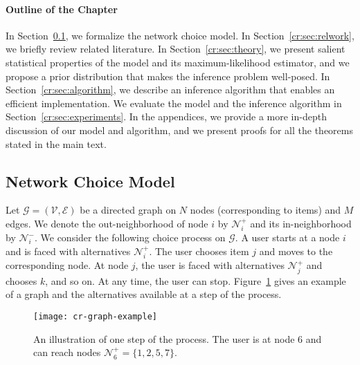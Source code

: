 \paragraph{Outline of the Chapter}
In Section~\ref{cr:sec:model}, we formalize the network choice model.
In Section~\ref{cr:sec:relwork}, we briefly review related literature.
In Section~\ref{cr:sec:theory}, we present salient statistical properties of the model and its maximum-likelihood estimator, and we propose a prior distribution that makes the inference problem well-posed.
In Section~\ref{cr:sec:algorithm}, we describe an inference algorithm that enables an efficient implementation.
We evaluate the model and the inference algorithm in Section~\ref{cr:sec:experiments}.
In the appendices, we provide a more in-depth discussion of our model and algorithm, and we present proofs for all the theorems stated in the main text.


\subsection{Network Choice Model}  %
\label{cr:sec:model}

Let $\mathcal{G} = (\mathcal{V}, \mathcal{E})$ be a directed graph on $N$ nodes (corresponding to items) and $M$ edges.
We denote the out-neighborhood of node $i$ by $\mathcal{N}^+_i$ and its in-neighborhood by $\mathcal{N}^-_i$.
We consider the following choice process on $\mathcal{G}$.
A user starts at a node $i$ and is faced with alternatives $\mathcal{N}^+_i$.
The user chooses item $j$ and moves to the corresponding node.
At node $j$, the user is faced with alternatives $\mathcal{N}^+_j$ and chooses $k$, and so on.
At any time, the user can stop.
Figure~\ref{cr:fig:samplenet} gives an example of a graph and the alternatives available at a step of the process.

\begin{figure}
  \centering
  \texttt{[image: cr-graph-example]}
  \caption{An illustration of one step of the process.
  The user is at node 6 and can reach nodes $\mathcal{N}^+_6 = \{1, 2, 5, 7\}$.}
  \label{cr:fig:samplenet}
\end{figure}

